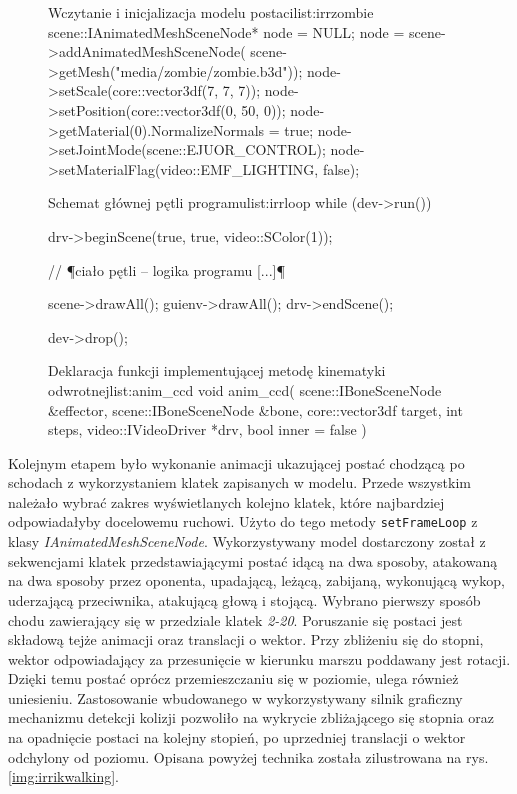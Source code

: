 \documentclass[11pt]{mwrep}
\begin{document}
\begin{figure}[p]
\begin{listing}{Wczytanie i inicjalizacja modelu postaci}{list:irrzombie}
	scene::IAnimatedMeshSceneNode* node = NULL;
	node = scene->addAnimatedMeshSceneNode(
			scene->getMesh("media/zombie/zombie.b3d"));
	node->setScale(core::vector3df(7, 7, 7));
	node->setPosition(core::vector3df(0, 50, 0));
	node->getMaterial(0).NormalizeNormals = true;
	node->setJointMode(scene::EJUOR_CONTROL);
	node->setMaterialFlag(video::EMF_LIGHTING, false);
\end{listing}
\end{figure}

\begin{figure}[p]
\begin{listing}{Schemat głównej pętli programu}{list:irrloop}
	while (dev->run()) {
		drv->beginScene(true, true, video::SColor(1));

		// ¶ciało pętli -- logika programu [...]¶

		scene->drawAll();
		guienv->drawAll();
		drv->endScene();
	}
	dev->drop();
\end{listing}
\end{figure}

\begin{figure}[p]
\begin{listing}{Deklaracja funkcji implementującej metodę kinematyki odwrotnej}{list:anim_ccd}
void anim_ccd( scene::IBoneSceneNode &effector,
		  scene::IBoneSceneNode &bone,
		  core::vector3df target,
		  int steps,
		  video::IVideoDriver *drv,
		  bool inner = false  )
\end{listing}
\end{figure}
\pagebreak
Kolejnym etapem było wykonanie animacji ukazującej postać chodzącą po schodach z wykorzystaniem klatek zapisanych w modelu. Przede wszystkim należało wybrać zakres wyświetlanych kolejno klatek, które najbardziej odpowiadałyby docelowemu ruchowi. Użyto do tego metody \texttt{setFrameLoop} z klasy \textit{IAnimatedMeshSceneNode}. Wykorzystywany model dostarczony został z sekwencjami klatek przedstawiającymi postać idącą na dwa sposoby, atakowaną na dwa sposoby przez oponenta, upadającą, leżącą, zabijaną, wykonującą wykop, uderzającą przeciwnika, atakującą głową i stojącą. Wybrano pierwszy sposób chodu zawierający się w przedziale klatek \textit{2-20}. Poruszanie się postaci jest składową tejże animacji oraz translacji o wektor. Przy zbliżeniu się do stopni, wektor odpowiadający za przesunięcie w kierunku marszu poddawany jest rotacji. Dzięki temu postać oprócz przemieszczaniu się w poziomie, ulega również uniesieniu. Zastosowanie wbudowanego w wykorzystywany silnik graficzny mechanizmu detekcji kolizji pozwoliło na wykrycie zbliżającego się stopnia oraz na opadnięcie postaci na kolejny stopień, po uprzedniej translacji o wektor odchylony od poziomu. Opisana powyżej technika została zilustrowana na rys. \ref{img:irrikwalking}.
\end{document}
